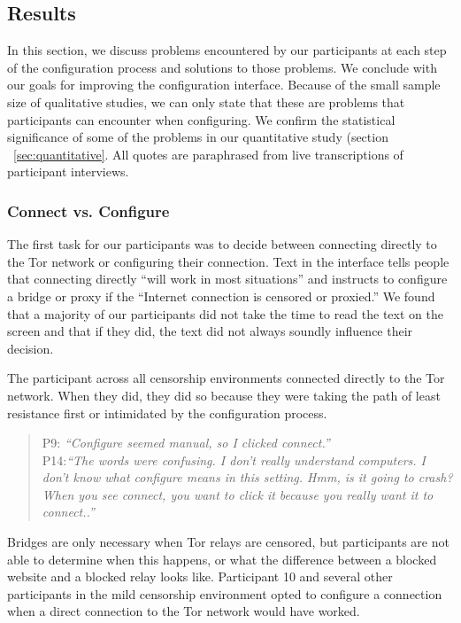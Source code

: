 \documentclass{template}
\begin{document}
\subsection{Results} 
In this section, we discuss problems encountered by our participants at each step of the configuration process and solutions to those problems. We conclude with our goals for improving the configuration interface. Because of the small sample size of qualitative studies, we can only state that these are problems that participants can encounter when configuring. We confirm the statistical significance of some of the problems in our quantitative study (section ~\ref {sec:quantitative}. All quotes are paraphrased from live transcriptions of participant interviews.\\

\subsubsection{Connect vs. Configure} 
The first task for our participants was to decide between connecting directly to the Tor network or configuring their connection. Text in the interface tells people that connecting directly ``will work in most situations'' and instructs to configure a bridge or proxy if the ``Internet connection is censored or proxied.'' We found that a majority of our participants did not take the time to read the text on the screen and that if they did, the text did not always soundly influence their decision.

The participant across all censorship environments connected directly to the Tor network. When they did, they did so because they were taking the path of least resistance first or intimidated by the configuration process. 
\begin{quotation}
\noindent P9: \textit{``Configure seemed manual, so I clicked connect.''}\\

\noindent P14:\textit{``The words were confusing. I don't really understand computers. I don't know what configure means in this setting. Hmm, is it going to crash? When you see connect, you want to click it because you really want it to connect..''} 
\end{quotation}

Bridges are only necessary when Tor relays are censored, but participants are not able to determine when this happens, or what the difference between a blocked website and a blocked relay looks like. Participant 10 and several other participants in the mild censorship environment opted to configure a connection when a direct connection to the Tor network would have worked. 
\end{document}
